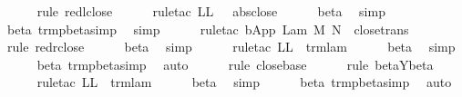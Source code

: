 \begin{isabellebody}
\ \ \ \ \isamarkupfalse%
\ {\isacharparenleft}rule\ red{\isacharunderscore}l{\isacharunderscore}close{\isacharparenright}\isanewline
\ \ \ \ \isamarkupfalse%
\ {\isacharparenleft}rule{\isacharunderscore}tac\ L{\isacharequal}L\ \ \ abs{\isacharunderscore}close{\isacharparenright}\isanewline
\ \ \ \ \isamarkupfalse%
\ beta\ \isamarkupfalse%
\ simp\isanewline
\ \ \ \ \isamarkupfalse%
\ beta\ trm{\isacharunderscore}pbeta{\isacharunderscore}simp{}\ \isamarkupfalse%
\ simp{\isacharplus}\isanewline
\ \ \ \ \isamarkupfalse%
\ {\isacharparenleft}rule{\isacharunderscore}tac\ b{\isacharequal}{\isachardoublequoteopen}App\ {\isacharparenleft}Lam\ M{\isacharprime}{\isacharparenright}\ N{\isacharprime}{\isachardoublequoteclose}\ \ close{\isachardot}trans{\isacharparenright}\isanewline
\ \ \ \ \isamarkupfalse%
\ {\isacharparenleft}rule\ red{\isacharunderscore}r{\isacharunderscore}close{\isacharparenright}\isanewline
\ \ \ \ \isamarkupfalse%
\ beta\ \isamarkupfalse%
\ simp\isanewline
\ \ \ \ \isamarkupfalse%
\ {\isacharparenleft}rule{\isacharunderscore}tac\ L{\isacharequal}L\ \ trm{\isachardot}lam{\isacharparenright}\isanewline
\ \ \ \ \isamarkupfalse%
\ beta\ \isamarkupfalse%
\ simp\isanewline
\ \ \ \ \isamarkupfalse%
\ beta{\isacharparenleft}{}{\isacharparenright}\ trm{\isacharunderscore}pbeta{\isacharunderscore}simp{}\ \isamarkupfalse%
\ auto{\isacharbrackleft}{}{\isacharbrackright}\isanewline
\ \ \ \ \isamarkupfalse%
\ {\isacharparenleft}rule\ close{\isachardot}base{\isacharparenright}\isanewline
\ \ \ \ \isamarkupfalse%
\ {\isacharparenleft}rule\ beta{\isacharunderscore}Y{\isachardot}beta{\isacharparenright}\isanewline
\ \ \ \ \isamarkupfalse%
\ {\isacharparenleft}rule{\isacharunderscore}tac\ L{\isacharequal}L\ \ trm{\isachardot}lam{\isacharparenright}\isanewline
\ \ \ \ \isamarkupfalse%
\ beta\ \isamarkupfalse%
\ simp\isanewline
\ \ \ \ \isamarkupfalse%
\ beta{\isacharparenleft}{}{\isacharparenright}\ trm{\isacharunderscore}pbeta{\isacharunderscore}simp{}\ \isamarkupfalse%
\ auto{\isacharbrackleft}{}{\isacharbrackright}\isanewline
\ \ \ \ \isamarkupfalse%

\end{isabellebody}
